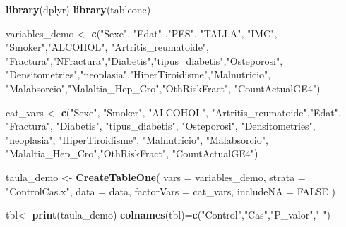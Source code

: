 \documentclass[
]{article}
\newenvironment{Shaded}{\begin{snugshade}}{\end{snugshade}}
\newcommand{\AttributeTok}[1]{\textcolor[rgb]{0.13,0.29,0.53}{#1}}
\newcommand{\ConstantTok}[1]{\textcolor[rgb]{0.56,0.35,0.01}{#1}}
\newcommand{\FunctionTok}[1]{\textcolor[rgb]{0.13,0.29,0.53}{\textbf{#1}}}
\newcommand{\NormalTok}[1]{#1}
\newcommand{\OtherTok}[1]{\textcolor[rgb]{0.56,0.35,0.01}{#1}}
\newcommand{\StringTok}[1]{\textcolor[rgb]{0.31,0.60,0.02}{#1}}
\begin{document}
\begin{Shaded}
\begin{Highlighting}[]
\FunctionTok{library}\NormalTok{(dplyr)}
\FunctionTok{library}\NormalTok{(tableone)}

\NormalTok{variables\_demo }\OtherTok{\textless{}{-}} \FunctionTok{c}\NormalTok{(}\StringTok{"Sexe"}\NormalTok{, }\StringTok{"Edat"}\NormalTok{ ,}\StringTok{"PES"}\NormalTok{, }\StringTok{"TALLA"}\NormalTok{, }\StringTok{"IMC"}\NormalTok{,}
                  \StringTok{"Smoker"}\NormalTok{,}\StringTok{"ALCOHOL"}\NormalTok{, }\StringTok{"Artritis\_reumatoide"}\NormalTok{,}
                  \StringTok{"Fractura"}\NormalTok{,}\StringTok{"NFractura"}\NormalTok{,}\StringTok{"Diabetis"}\NormalTok{,}\StringTok{"tipus\_diabetis"}\NormalTok{,}\StringTok{"Osteporosi"}\NormalTok{, }
                  \StringTok{"Densitometries"}\NormalTok{,}\StringTok{"neoplasia"}\NormalTok{,}\StringTok{"HiperTiroidisme"}\NormalTok{,}\StringTok{"Malnutricio"}\NormalTok{,}
                  \StringTok{"Malabsorcio"}\NormalTok{,}\StringTok{"Malaltia\_Hep\_Cro"}\NormalTok{,}\StringTok{"OthRiskFract"}\NormalTok{, }\StringTok{"CountActualGE4"}\NormalTok{)}

\NormalTok{cat\_vars }\OtherTok{\textless{}{-}} \FunctionTok{c}\NormalTok{(}\StringTok{"Sexe"}\NormalTok{, }\StringTok{"Smoker"}\NormalTok{, }\StringTok{"ALCOHOL"}\NormalTok{, }\StringTok{"Artritis\_reumatoide"}\NormalTok{,}\StringTok{"Edat"}\NormalTok{, }
              \StringTok{"Fractura"}\NormalTok{, }\StringTok{"Diabetis"}\NormalTok{, }\StringTok{"tipus\_diabetis"}\NormalTok{, }\StringTok{"Osteporosi"}\NormalTok{, }\StringTok{"Densitometries"}\NormalTok{,}
              \StringTok{"neoplasia"}\NormalTok{, }\StringTok{"HiperTiroidisme"}\NormalTok{, }\StringTok{"Malnutricio"}\NormalTok{, }\StringTok{"Malabsorcio"}\NormalTok{, }
              \StringTok{"Malaltia\_Hep\_Cro"}\NormalTok{,}\StringTok{"OthRiskFract"}\NormalTok{, }\StringTok{"CountActualGE4"}\NormalTok{)}

\NormalTok{taula\_demo }\OtherTok{\textless{}{-}} \FunctionTok{CreateTableOne}\NormalTok{(}
  \AttributeTok{vars =}\NormalTok{ variables\_demo,}
  \AttributeTok{strata =} \StringTok{"ControlCas.x"}\NormalTok{,}
  \AttributeTok{data =}\NormalTok{ data,}
  \AttributeTok{factorVars =}\NormalTok{ cat\_vars,}
  \AttributeTok{includeNA =} \ConstantTok{FALSE}
\NormalTok{)}

\NormalTok{tbl}\OtherTok{\textless{}{-}} \FunctionTok{print}\NormalTok{(taula\_demo)}
\FunctionTok{colnames}\NormalTok{(tbl)}\OtherTok{=}\FunctionTok{c}\NormalTok{(}\StringTok{"Control"}\NormalTok{,}\StringTok{"Cas"}\NormalTok{,}\StringTok{"P\_valor"}\NormalTok{,}\StringTok{" "}\NormalTok{)}
\end{Highlighting}
\end{Shaded}
\end{document}
